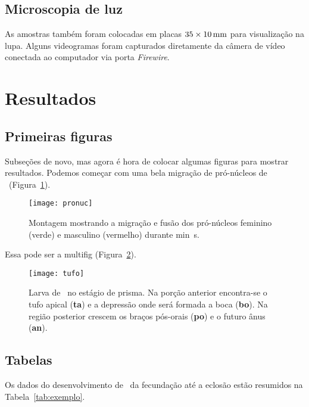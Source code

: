 \subsection{Microscopia de luz}\label{cap2:mem:micro}

As amostras também foram colocadas em placas $35\times\unit[10]{mm}$ para visualização na lupa.
Alguns videogramas foram capturados diretamente da câmera de vídeo conectada ao computador via porta \emph{Firewire}.

\section{Resultados}\label{cap2:res}

\subsection{Primeiras figuras}\label{cap2:res:figs}

Subseções de novo, mas agora é hora de colocar algumas figuras para mostrar resultados. Podemos começar com uma bela migração de pró-núcleos de \subde\ (Figura~\ref{fig:pronuc}).

\begin{figure}[htbp]
  \centering
  \texttt{[image: pronuc]}
  \caption[Migração dos pró-núcleos]{Montagem mostrando a migração e fusão dos pró-núcleos feminino (verde) e masculino (vermelho) durante \unit[12]{min}~\unit[30]{s}.}
  \label{fig:pronuc}
\end{figure}

Essa pode ser a multifig (Figura~\ref{fig:tufo}).

\begin{figure}[htbp]
  \centering
  \texttt{[image: tufo]}
  \caption[Prisma sob MEV]{Larva de \subdeshort\ no estágio de prisma. Na porção anterior encontra-se o tufo apical (\textbf{ta}) e a depressão onde será formada a boca (\textbf{bo}). Na região posterior crescem os braços pós-orais (\textbf{po}) e o futuro ânus (\textbf{an}).}
  \label{fig:tufo}
\end{figure}

\subsection{Tabelas}\label{cap2:res:tabs}

Os dados do desenvolvimento de \subdeshort\ da fecundação até a eclosão estão resumidos na Tabela~\ref{tab:exemplo}.

